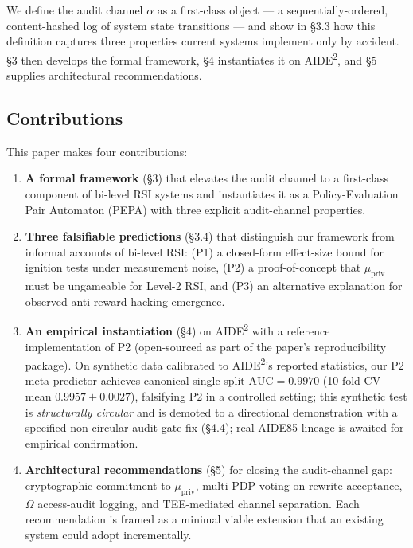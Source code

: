 We define the audit channel $\alpha$ as a first-class object --- a sequentially-ordered, content-hashed log of system state transitions --- and show in \S3.3 how this definition captures three properties current systems implement only by accident. \S3 then develops the formal framework, \S4 instantiates it on AIDE\textsuperscript{2}, and \S5 supplies architectural recommendations.

\subsection{Contributions}

This paper makes four contributions:

\begin{enumerate}
    \item \textbf{A formal framework} (\S3) that elevates the audit channel to a first-class component of bi-level RSI systems and instantiates it as a Policy-Evaluation Pair Automaton (PEPA) with three explicit audit-channel properties.
    \item \textbf{Three falsifiable predictions} (\S3.4) that distinguish our framework from informal accounts of bi-level RSI: (P1) a closed-form effect-size bound for ignition tests under measurement noise, (P2) a proof-of-concept that $\mu_{\text{priv}}$ must be ungameable for Level-2 RSI, and (P3) an alternative explanation for observed anti-reward-hacking emergence.
    \item \textbf{An empirical instantiation} (\S4) on AIDE\textsuperscript{2} with a reference implementation of P2 (open-sourced as part of the paper's reproducibility package). On synthetic data calibrated to AIDE\textsuperscript{2}'s reported statistics, our P2 meta-predictor achieves canonical single-split $\text{AUC} = 0.9970$ (10-fold CV mean $0.9957\pm0.0027$), falsifying P2 in a controlled setting; this synthetic test is \emph{structurally circular} and is demoted to a directional demonstration with a specified non-circular audit-gate fix (\S4.4); real AIDE85 lineage is awaited for empirical confirmation.
    \item \textbf{Architectural recommendations} (\S5) for closing the audit-channel gap: cryptographic commitment to $\mu_{\text{priv}}$, multi-PDP voting on rewrite acceptance, $\Omega$ access-audit logging, and TEE-mediated channel separation. Each recommendation is framed as a minimal viable extension that an existing system could adopt incrementally.
\end{enumerate}

